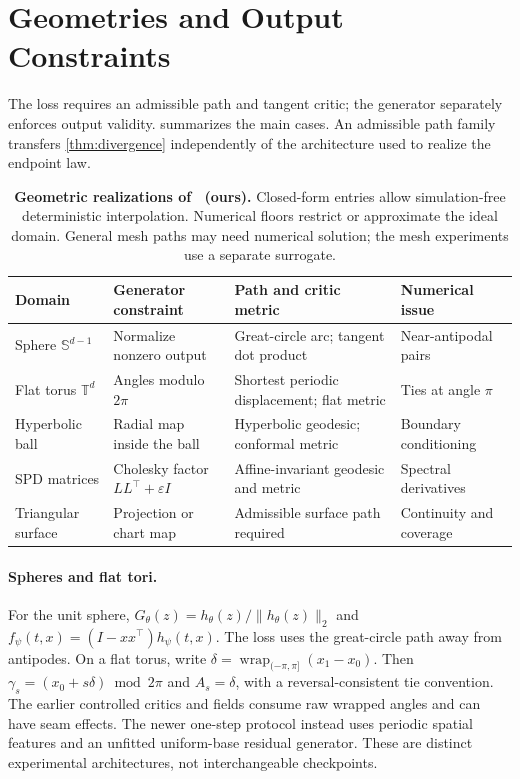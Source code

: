 \section{Geometries and Output Constraints}
\label{sec:geometries}
The loss requires an admissible path and tangent critic; the generator separately enforces output validity.  summarizes the main cases. An admissible path family transfers \cref{thm:divergence} independently of the architecture used to realize the endpoint law.

\begin{table}[t]
\caption{\textbf{Geometric realizations of \RMGM\ (ours).} Closed-form entries allow simulation-free deterministic interpolation. Numerical floors restrict or approximate the ideal domain. General mesh paths may need numerical solution; the mesh experiments use a separate surrogate.}
\label{tab:geometries}
\centering
\small
\begin{tabular}{@{}llll@{}}
\toprule
Domain & Generator constraint & Path and critic metric & Numerical issue \\
\midrule
Sphere $\mathbb S^{d-1}$ & Normalize nonzero output & Great-circle arc; tangent dot product & Near-antipodal pairs \\
Flat torus $\mathbb T^d$ & Angles modulo $2\pi$ & Shortest periodic displacement; flat metric & Ties at angle $\pi$ \\
Hyperbolic ball & Radial map inside the ball & Hyperbolic geodesic; conformal metric & Boundary conditioning \\
SPD matrices & Cholesky factor $LL^\top+\varepsilon I$ & Affine-invariant geodesic and metric & Spectral derivatives \\
Triangular surface & Projection or chart map & Admissible surface path required & Continuity and coverage \\
\bottomrule
\end{tabular}
\end{table}

\paragraph{Spheres and flat tori.}
For the unit sphere, $G_\theta(z)=h_\theta(z)/\|h_\theta(z)\|_2$ and $f_\psi(t,x)=(I-xx^\top)h_\psi(t,x)$. The loss uses the great-circle path away from antipodes. On a flat torus, write $\delta=\operatorname{wrap}_{(-\pi,\pi]}(x_1-x_0)$. Then $\gamma_s=(x_0+s\delta)\bmod 2\pi$ and $A_s=\delta$, with a reversal-consistent tie convention. The earlier controlled critics and fields consume raw wrapped angles and can have seam effects. The newer one-step protocol instead uses periodic spatial features and an unfitted uniform-base residual generator. These are distinct experimental architectures, not interchangeable checkpoints.

